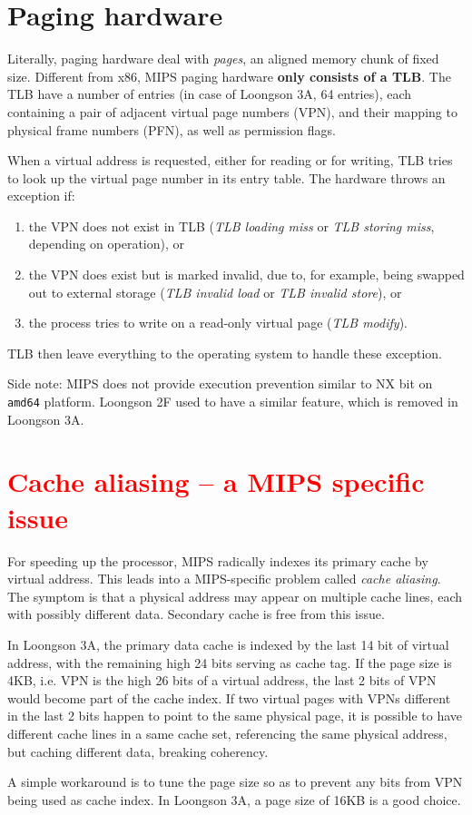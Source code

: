 \documentclass{report}
\def \hilite#1{\textcolor{red}{#1}}
\newenvironment{hilight}{\color{red}}{\color{black}}
\begin{document}
	\section{Paging hardware}
	\begin{hilight}
		Literally, paging hardware deal with \emph{pages}, an aligned memory chunk of fixed size.
		Different from x86, MIPS paging hardware \textbf{only consists of a TLB}.
		The TLB have a number of entries (in case of Loongson 3A, 64 entries), each
		containing a pair of adjacent virtual page numbers (VPN), and their mapping to physical
		frame numbers (PFN), as well as permission flags.
		
		When a virtual address is requested, either for reading or for writing, TLB
		tries to look up the virtual page number in its entry table.  The hardware throws an
		exception if:
		\begin{enumerate}
			\item the VPN does not exist in TLB (\emph{TLB loading miss} or \emph{TLB storing miss},
			depending on operation), or
			\item the VPN does exist but is marked invalid, due to, for example, being swapped out
			to external storage (\emph{TLB invalid load} or \emph{TLB invalid store}), or
			\item the process tries to write on a read-only virtual page (\emph{TLB modify}).
		\end{enumerate}
		TLB then leave everything to the operating system to handle these exception.
		
		Side note: MIPS does not provide execution prevention similar to NX bit on \texttt{amd64} platform.
		Loongson 2F used to have a similar feature, which is removed in Loongson 3A.
	\end{hilight}
	
	\section{\hilite{Cache aliasing -- a MIPS specific issue}}
	\begin{hilight}
		For speeding up the processor, MIPS radically indexes its primary cache by virtual address.
		This leads into a MIPS-specific problem called \emph{cache aliasing}.  The symptom is that
		a physical address may appear on multiple cache lines, each with possibly different data.
		Secondary cache is free from this issue.
		
		In Loongson 3A, the primary data cache is indexed by the last 14 bit of virtual address,
		with the remaining high 24 bits serving as cache tag.  If the page size is 4KB, i.e. VPN
		is the high 26 bits of a virtual address, the last 2 bits of VPN would become part of the
		cache index.  If two virtual pages with VPNs different in the last 2 bits happen to point
		to the same physical page, it is possible to have different cache lines in a same cache set,
		referencing the same physical address, but caching different data, breaking coherency.
		
		A simple workaround is to tune the page size so as to prevent any bits from VPN being used as
		cache index.  In Loongson 3A, a page size of 16KB is a good choice.
	\end{hilight}
	
\end{document}
